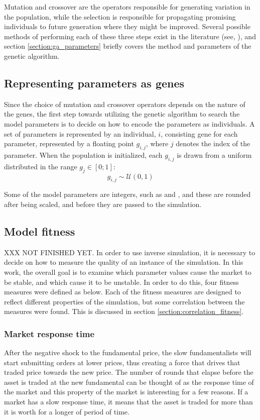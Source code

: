 Mutation and crossover are the operators responsible for generating variation in the population, while the selection is responsible for propagating promising individuals to future generation where they might be improved. Several possible methods of performing each of these three steps exist in the literature (see\cite{genetic1}, \cite{genetic2}), and section \ref{section:ga_parameters} briefly covers the method and parameters of the genetic algorithm.

\subsection{Representing parameters as genes}
Since the choice of mutation and crossover operators depends on the nature of the genes, the first step towards utilizing the genetic algorithm to search the model parameters is to decide on how to encode the parameters as individuals. 
A set of parameters is represented by an individual, $i$, consisting gene for each parameter, represented by a floating point $g_{i,j}$, where $j$ denotes the index of the parameter. When the population is initialized, each $g_{i,j}$ is drawn from a uniform distributed in the range $g_j \in [0;1]$:
\begin{equation}
g_{i,j} \sim \mathcal{U}(0,1)
\end{equation}

Some of the model parameters are integers, such as \ssmmnAgents{} and \scnAgents{}, and these are rounded after being scaled, and before they are passed to the simulation.





\subsection{Model fitness}\label{section:simulation_fitness}
XXX NOT FINISHED YET. 
In order to use inverse simulation, it is necessary to decide on how to measure the quality of an instance of the simulation. In this work, the overall goal is to examine which parameter values cause the market to be stable, and which cause it to be unstable. In order to do this, four fitness measures were defined as below. Each of the fitness measures are designed to reflect different properties of the simulation, but some correlation between the measures were found. This is discussed in section \ref{section:correlation_fitness}.

\subsubsection{Market response time}
After the negative shock to the fundamental price, the slow fundamentalists will start submitting orders at lower prices, thus creating a force that drives that traded price towards the new price. The number of rounds that elapse before the asset is traded at the new fundamental  can be thought of as the response time of the market and this property of the market is interesting for a few reasons. If a market has a slow response time, it means that the asset is traded for more than it is worth for a longer of period of time. 

